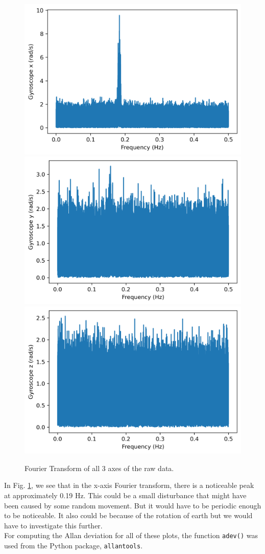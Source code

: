 \documentclass[a4paper]{article}
\begin{document}
\begin{figure}[hbt!]
     \centering
	 {{\includegraphics[width=0.4\columnwidth]{fft_x.png}}}
	 {{\includegraphics[width=0.4\columnwidth]{fft_y.png}}}
	 {{\includegraphics[width=0.4\columnwidth]{fft_z.png}}}
	 \caption{Fourier Transform of all 3 axes of the raw data.}
	 \label{fig:fft}
\end{figure}

In Fig. \ref{fig:fft}, we see that in the x-axis Fourier transform, there is a noticeable peak at approximately 0.19 Hz. This could be a small disturbance that might have been caused by some random movement. But it would have to be periodic enough to be noticeable. It also could be because of the rotation of earth but we would have to investigate this further. \\

For computing the Allan deviation for all of these plots, the function \texttt{adev()} was used from the Python package, \texttt{allantools}. 
\end{document}

